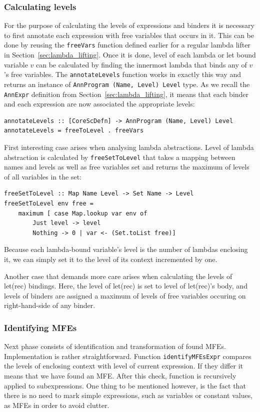 \documentclass[12pt,a4paper]{report}
\begin{document}
\subsubsection{Calculating levels}
For the purpose of calculating the levels of expressions and binders it is
necessary to first annotate each expression with free variables that occurs in
it. This can be done by reusing the \texttt{freeVars} function defined earlier
for a regular lambda lifter in Section~\ref{sec:lambda_lifting}. Once it is
done, level of each lambda or let bound variable $v$ can be calculated by
finding the innermost lambda that binds any of $v$'s free variables. The
\texttt{annotateLevels} function works in exactly this way and returns an
instance of \texttt{AnnProgram (Name, Level) Level} type. As we recall the
\texttt{AnnExpr} definition from Section~\ref{sec:lambda_lifting}, it means
that each binder and each expression are now associated the appropriate levels:

\vspace*{0.2in}
\begin{lstlisting}[style=haskell]
annotateLevels :: [CoreScDefn] -> AnnProgram (Name, Level) Level
annotateLevels = freeToLevel . freeVars
\end{lstlisting}

First interesting case arises when analysing lambda abstractions. Level of
lambda abstraction is calculated by \texttt{freeSetToLevel} that takes a
mapping between names and levels as well as free variables set and returns the
maximum of levels of all variables in the set:

\vspace*{0.2in}
\begin{lstlisting}[style=haskell]
freeSetToLevel :: Map Name Level -> Set Name -> Level
freeSetToLevel env free =
    maximum [ case Map.lookup var env of
        Just level -> level
        Nothing -> 0 | var <- (Set.toList free)]
\end{lstlisting}

Because each lambda-bound variable's level is the number of lambdas enclosing
it, we can simply set it to the level of its context incremented by one.

Another case that demands more care arises when calculating the levels of
let(rec) bindings. Here, the level of let(rec) is set to level of let(rec)'s
body, and levels of binders are assigned a maximum of levels of free variables
occuring on right-hand-side of any binder.

\subsubsection{Identifying MFEs}
Next phase consists of identification and transformation of found MFEs.
Implementation is rather straightforward. Function \texttt{identifyMFEsExpr}
compares the levels of enclosing context with level of current expression. If
they differ it means that we have found an MFE. After this check, function is
recursively applied to subexpressions. One thing to be mentioned however, is
the fact that there is no need to mark simple expressions, such as variables or
constant values, as MFEs in order to avoid clutter.
\end{document}
